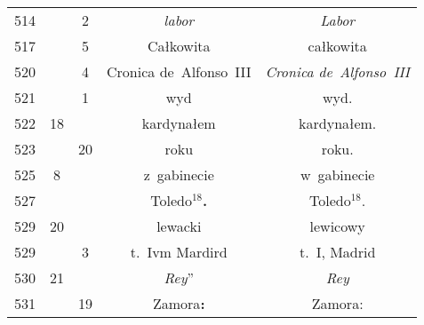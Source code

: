 \documentclass[a4paper,11pt]{article}
\begin{document}
\begin{center}
\begin{tabular}{|c|c|c|c|c|}
    514 & &  2 & \textit{labor} & \textit{Labor} \\
    517 & &  5 & Całkowita & całkowita \\
    520 & &  4 & Cronica de~Alfonso~III & \textit{Cronica de~Alfonso~III} \\
    521 & &  1 & wyd & wyd. \\
    522 & 18 & & kardynałem & kardynałem. \\
    523 & & 20 & roku & roku. \\
    525 &  8 & & z~gabinecie & w~gabinecie \\
    527 & & & Toledo$^{ 18 }$\textbf{.} & Toledo$^{ 18 }$. \\
    529 & 20 & & lewacki & lewicowy \\
    529 & &  3 & t.~Ivm Mardird & t.~I, Madrid \\
    530 & 21 & & \textit{Rey}” & \textit{Rey} \\
    531 & & 19 & Zamora\textbf{:} & Zamora: \\
    \hline
  \end{tabular}






\end{center}
\end{document}
